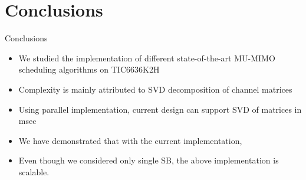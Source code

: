 \documentclass[11pt]{beamer}
\begin{document}
\section{Conclusions}

\begin{frame}{Conclusions}
\begin{itemize}
\item We studied the implementation of different state-of-the-art MU-MIMO scheduling algorithms on TIC6636K2H
\item Complexity is mainly attributed to SVD decomposition of channel matrices
\item Using parallel implementation, current design can support  SVD of  matrices in  msec
\item We have demonstrated that with the current implementation, 
\item Even though we considered only single SB, the above implementation is scalable.
\end{itemize}
\end{frame}
\end{document}
